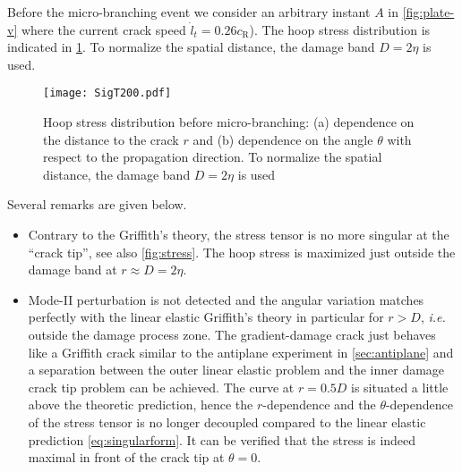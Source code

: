 Before the micro-branching event we consider an arbitrary instant $A$ in \cref{fig:plate-v} where the current crack speed $\dot{l}_t=0.26c_\mathrm{R}$). The hoop stress distribution is indicated in \cref{fig:SigT200}. To normalize the spatial distance, the damage band $D=2\eta$ is used.
\begin{figure}[htbp]
\centering
\texttt{[image: SigT200.pdf]}
\caption{Hoop stress distribution before micro-branching: (a) dependence on the distance to the crack $r$ and (b) dependence on the angle $\theta$ with respect to the propagation direction. To normalize the spatial distance, the damage band $D=2\eta$ is used} \label{fig:SigT200}
\end{figure}
Several remarks are given below.
\begin{itemize}
\item Contrary to the Griffith's theory, the stress tensor is no more singular at the ``crack tip'', see also \cref{fig:stress}. The hoop stress is maximized just outside the damage band at $r\approx D=2\eta$.

\item Mode-II perturbation is not detected and the angular variation matches perfectly with the linear elastic Griffith's theory in particular for $r>D$, \emph{i.e.} outside the damage process zone. The gradient-damage crack just behaves like a Griffith crack similar to the antiplane experiment in \cref{sec:antiplane} and a separation between the outer linear elastic problem and the inner damage crack tip problem can be achieved. The curve at $r=0.5D$ is situated a little above the theoretic prediction, hence the $r$-dependence and the $\theta$-dependence of the stress tensor is no longer decoupled compared to the linear elastic prediction \eqref{eq:singularform}. It can be verified that the stress is indeed maximal in front of the crack tip at $\theta=0$.
\end{itemize}

